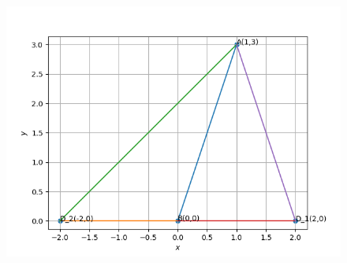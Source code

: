 \documentclass[journal,12pt,onecolumn]{IEEEtran}
\begin{document}
        \begin{figure}[H]
    \centering
    \includegraphics[width = 0.7\columnwidth]{figs/img.png}
    \caption*{}
    \label{figs}
\end{figure}
\end{document}
